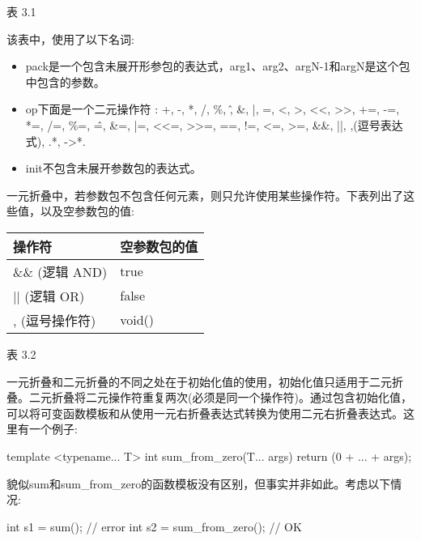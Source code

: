 \begin{center}
表 3.1
\end{center}

该表中，使用了以下名词:

\begin{itemize}
\item
pack是一个包含未展开形参包的表达式，arg1、arg2、argN-1和argN是这个包中包含的参数。

\item
op下面是一个二元操作符 : +, -, *, /, \%, \^, \&, |, =, <, >, <{}<, >{}>, +=, -=, *=, /=, \%=, \^=, \&=, |=, <{}<=, >{}>=, ==, !=, <=, >=, \&\&, ||, ,(逗号表达式), .*, ->*.

\item
init不包含未展开参数包的表达式。
\end{itemize}

一元折叠中，若参数包不包含任何元素，则只允许使用某些操作符。下表列出了这些值，以及空参数包的值:

\begin{table}[H]
\centering
	\begin{tabular}{|l|l|}
		\hline
		\textbf{操作符}  & \textbf{空参数包的值} \\ \hline
		\&\& (逻辑 AND) & true                             \\ \hline
		|| (逻辑 OR)    & false                            \\ \hline
		, (逗号操作符) & void()                           \\ \hline
	\end{tabular}
\end{table}

\begin{center}
表 3.2
\end{center}

一元折叠和二元折叠的不同之处在于初始化值的使用，初始化值只适用于二元折叠。二元折叠将二元操作符重复两次(必须是同一个操作符)。通过包含初始化值，可以将可变函数模板和从使用一元右折叠表达式转换为使用二元右折叠表达式。这里有一个例子:

\begin{cpp}
template <typename... T>
int sum_from_zero(T... args)
{
	return (0 + ... + args);
}
\end{cpp}

貌似sum和sum\_from\_zero的函数模板没有区别，但事实并非如此。考虑以下情况:

\begin{cpp}
int s1 = sum(); // error
int s2 = sum_from_zero(); // OK
\end{cpp}

